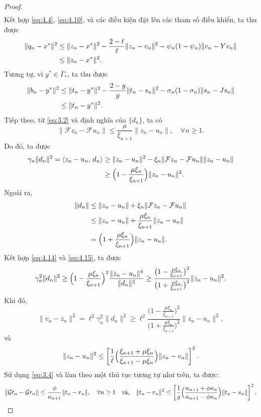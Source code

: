 \documentclass{MyBook}
\theoremstyle{plain}
\theoremstyle{definition}
\theoremstyle{remark}
\numberwithin{equation}{chapter}
\newcommand{\Fc}{\mathcal{F}}
\newcommand{\Gc}{\mathcal{G}}
\newcommand{\inp}[2]{\langle #1,\,#2\rangle}
\newcommand{\nm}[1]{\lVert #1\rVert}
\newcommand{\Gams}{\bar{\Gamma}_{*}}
\begin{document}
\begin{proof}
\begin{align}
\end{align}
Kết hợp \eqref{eq:4.4}, \eqref{eq:4.10}, và các điều kiện đặt lên các tham số điều khiển, ta thu được
\begin{align}
\nm{q_n-x^{*}}^2 &\le \nm{z_n-x^{*}}^2-\frac{2-\ell}{\ell}\nm{z_n-v_n}^2-\psi_n(1-\psi_n)\nm{v_n-Yv_n}\notag\\
&\le \nm{z_n-x^{*}}^2. \label{eq:4.11}
\end{align}
Tương tự, vì $y^{*}\in\Gams$, ta thu được
\begin{align}
\nm{b_n-y^{*}}^2 &\le \nm{t_n-y^{*}}^2-\frac{2-g}{g}\nm{t_n-s_n}^2-\sigma_n(1-\sigma_n)\nm{s_n-Js_n}\notag\\
&\le \nm{t_n-y^{*}}^2. \label{eq:4.12}
\end{align}
Tiếp theo, từ \eqref{eq:3.2} và định nghĩa của $\{d_n\}$, ta có
\begin{equation}
\nm{\Fc z_n-\Fc u_n}\le\frac{\mu}{\xi_{n+1}}\nm{z_n-u_n},\quad\forall n\ge 1. \label{eq:4.13}
\end{equation}
Do đó, ta được
\begin{align}
\gamma_n\nm{d_n}^2=\inp{z_n-u_n}{d_n} &\ge \nm{z_n-u_n}^2-\xi_n\nm{\Fc z_n-\Fc u_n}\nm{z_n-u_n}\notag\\
&\ge \Bigl(1-\frac{\mu\xi_n}{\xi_{n+1}}\Bigr)\nm{z_n-u_n}^2. \label{eq:4.14}
\end{align}
Ngoài ra,
\begin{align}
\nm{d_n} &\le \nm{z_n-u_n}+\xi_n\nm{\Fc z_n-\Fc u_n}\notag\\
&\le \nm{z_n-u_n}+\frac{\mu\xi_n}{\xi_{n+1}}\nm{z_n-u_n}\notag\\
&= \Bigl(1+\frac{\mu\xi_n}{\xi_{n+1}}\Bigr)\nm{z_n-u_n}. \label{eq:4.15}
\end{align}
Kết hợp \eqref{eq:4.14} và \eqref{eq:4.15}, ta được
\[
\gamma_n^2\nm{d_n}^2\ge\Bigl(1-\frac{\mu\xi_n}{\xi_{n+1}}\Bigr)^2\frac{\nm{z_n-u_n}^4}{\nm{d_n}^2}\ge\frac{\bigl(1-\frac{\mu\xi_n}{\xi_{n+1}}\bigr)^2}{\bigl(1+\frac{\mu\xi_n}{\xi_{n+1}}\bigr)^2}\nm{z_n-u_n}^2.
\]
Khi đó,
\[
\nm{v_n-z_n}^2=\ell^2\gamma_n^2\nm{d_n}^2\ge\ell^2\frac{\bigl(1-\frac{\mu\xi_n}{\xi_{n+1}}\bigr)^2}{\bigl(1+\frac{\mu\xi_n}{\xi_{n+1}}\bigr)^2}\nm{z_n-u_n}^2,
\]
và
\[
\nm{z_n-u_n}^2\le\left[\frac{1}{\ell}\Bigl(\frac{\xi_{n+1}+\mu\xi_n}{\xi_{n+1}-\mu\xi_n}\Bigr)\nm{z_n-v_n}\right]^2.
\]
Sử dụng \eqref{eq:3.4} và làm theo một thủ tục tương tự như trên, ta được:
\[
\nm{\Gc t_n-\Gc r_n}\le\frac{\phi}{\kappa_{n+1}}\nm{t_n-r_n},\quad\forall n\ge 1\quad\text{và,}\quad \nm{t_n-r_n}^2\le\left[\frac{1}{g}\Bigl(\frac{\kappa_{n+1}+\phi\kappa_n}{\kappa_{n+1}-\phi\kappa_n}\Bigr)\nm{t_n-s_n}\right]^2.
\]
\end{proof}
\end{document}
